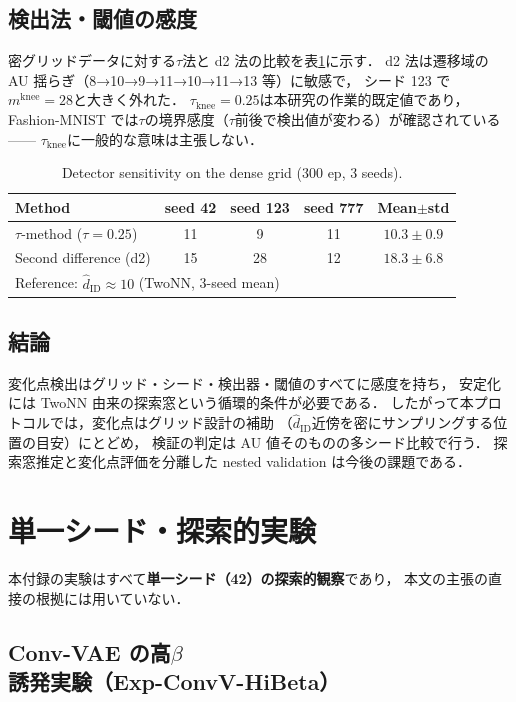 \documentclass[11pt,a4paper]{jsarticle}
\newcommand{\hatdID}{\hat{d}_{\mathrm{ID}}}
\newcommand{\mknee}{m^{\mathrm{knee}}}
\begin{document}
\subsection{検出法・閾値の感度}

密グリッドデータに対する$\tau$法と d2 法の比較を表\ref{tab:knee_method}に示す．
d2 法は遷移域の AU 揺らぎ（8→10→9→11→10→11→13 等）に敏感で，
シード 123 で$\mknee = 28$と大きく外れた．
$\tau_{\mathrm{knee}} = 0.25$は本研究の作業的既定値であり，
Fashion-MNIST では$\tau$の境界感度（$\tau$前後で検出値が変わる）が確認されている——
$\tau_{\mathrm{knee}}$に一般的な意味は主張しない．

\begin{table}[H]
\centering
\caption{Detector sensitivity on the dense grid (300 ep, 3 seeds).}
\label{tab:knee_method}
\small
\begin{tabular}{lcccc}
\toprule
Method & seed 42 & seed 123 & seed 777 & Mean$\pm$std \\
\midrule
$\tau$-method ($\tau = 0.25$) & 11 & 9 & 11 & $10.3 \pm 0.9$ \\
Second difference (d2) & 15 & 28 & 12 & $18.3 \pm 6.8$ \\
\midrule
\multicolumn{5}{l}{Reference: $\hatdID \approx 10$ (TwoNN, 3-seed mean)} \\
\bottomrule
\end{tabular}
\end{table}

\subsection{結論}

変化点検出はグリッド・シード・検出器・閾値のすべてに感度を持ち，
安定化には TwoNN 由来の探索窓という循環的条件が必要である．
したがって本プロトコルでは，変化点はグリッド設計の補助
（$\hatdID$近傍を密にサンプリングする位置の目安）にとどめ，
検証の判定は AU 値そのものの多シード比較で行う．
探索窓推定と変化点評価を分離した nested validation は今後の課題である．

\section{単一シード・探索的実験}\label{app:exploratory}

本付録の実験はすべて\textbf{単一シード（42）の探索的観察}であり，
本文の主張の直接の根拠には用いていない．

\subsection{Conv-VAE の高$\beta$誘発実験（Exp-ConvV-HiBeta）}
\end{document}

